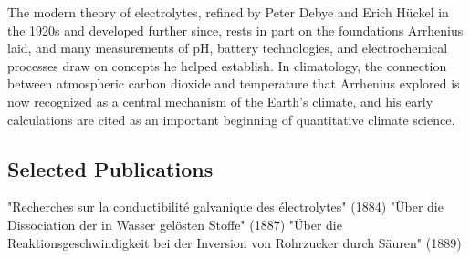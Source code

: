The modern theory of electrolytes, refined by Peter Debye and Erich Hückel in the 1920s and developed further since, rests in part on the foundations Arrhenius laid, and many measurements of pH, battery technologies, and electrochemical processes draw on concepts he helped establish. In climatology, the connection between atmospheric carbon dioxide and temperature that Arrhenius explored is now recognized as a central mechanism of the Earth's climate, and his early calculations are cited as an important beginning of quantitative climate science.

\subsection*{Selected Publications}

"Recherches sur la conductibilité galvanique des électrolytes" (1884)
"Über die Dissociation der in Wasser gelösten Stoffe" (1887)
"Über die Reaktionsgeschwindigkeit bei der Inversion von Rohrzucker durch Säuren" (1889)

